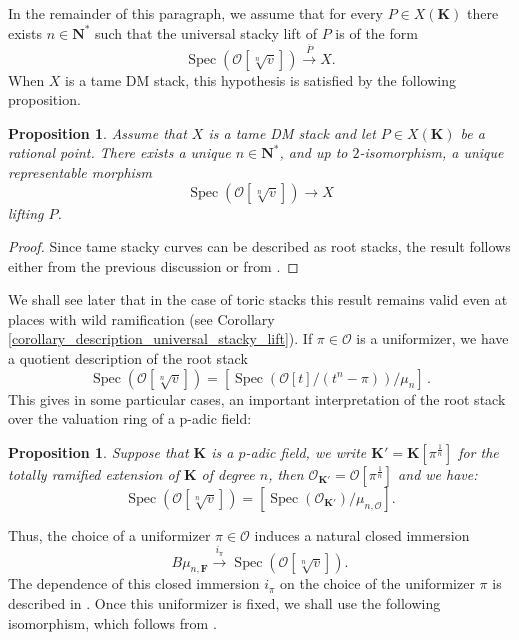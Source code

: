 \documentclass{proc-l}
\newcommand{\K}{\mathbf{K}}
\newcommand{\N}{\mathbf{N}}
\newcommand{\F}{\mathbf{F}}
\DeclareMathOperator{\Spec}{Spec}
\newcommand{\sheafO}{\mathcal{O}}
\newtheorem{prop}[theorem]{Proposition}
\theoremstyle{definition}
\theoremstyle{remark}
\numberwithin{equation}{section}
\begin{document}
In the remainder of this paragraph, we assume that for every $P \in X(\K)$ there exists $n \in \N^*$ such that the universal stacky lift of $P$ is of the form
$$
\Spec(\sheafO[\sqrt[n]{v}]) \xrightarrow{\overline P} X .
$$
When $X$ is a tame DM stack, this hypothesis is satisfied by the following proposition.

\begin{prop}\label{proposition_description_tame_universal_stacky_lift}
    Assume that $X$ is a tame DM stack and let $P \in X(\K)$ be a rational point. There exists a unique $n \in \N^*$, and up to $2$-isomorphism, a unique representable morphism
    $$
    \Spec(\sheafO[\sqrt[n]{v}]) \rightarrow X
    $$
    lifting $P$.
\end{prop}

\begin{proof}
Since tame stacky curves can be described as root stacks, the result follows either from the previous discussion or from \cite[Lemma 4.2]{loughran_santens_malle_conjecture}.
\end{proof}

We shall see later that in the case of toric stacks this result remains valid even at places with wild ramification (see Corollary \ref{corollary_description_universal_stacky_lift}). If $\pi \in \sheafO$ is a uniformizer, we have a quotient description of the root stack $$\Spec(\sheafO[\sqrt[n]{v}]) = \left[\Spec\left(\sheafO[t]/(t^n - \pi)\right) / \mu_n \right] \, .$$This gives in some particular cases, an important interpretation of the root stack over the valuation ring of a p-adic field:

\begin{prop}\label{proposition_description_root_stack_over_the_unrammified_closure_in_the_tame_case}
    Suppose that $\K$ is a $p$-adic field, we write $\K' = \K[\pi^{\frac{1}{n}}]$ for the totally ramified extension of $\K$ of degree $n$, then $\sheafO_{\K'} = \sheafO[\pi^{\frac{1}{n}}] $ and we have:
    $$\Spec(\sheafO[\sqrt[n]{v}]) = \left[\Spec\left(\sheafO_{\K'} \right) / \mu_{n,\sheafO} \right] .$$ 
\end{prop}

Thus, the choice of a uniformizer $\pi \in \sheafO$ induces a natural closed immersion
$$
B \mu_{n,\F} \xrightarrow{i_{\pi}} \Spec(\sheafO[\sqrt[n]{v}]).
$$
The dependence of this closed immersion $i_{\pi}$ on the choice of the uniformizer $\pi$ is described in \cite[Lemma 4.3]{loughran_santens_malle_conjecture}. Once this uniformizer is fixed, we shall use the following isomorphism, which follows from \cite[Proposition 5.2.11]{Brochard2008}.
\end{document}
